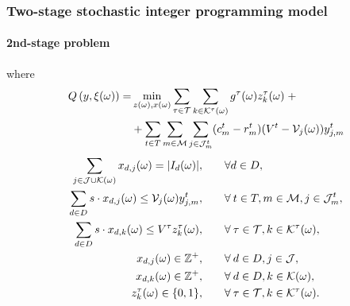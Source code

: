 \documentclass[9pt,xcolor={dvipsnames}]{beamer}
\begin{document}
\begin{frame}[allowframebreaks]
	\frametitle{Two-stage stochastic integer programming model}
	\framesubtitle{2nd-stage problem}
	where
	{
	\footnotesize
	\begin{equation}
		\begin{split}
			Q \left(y,\xi (\omega)\right) = & \min_{z(\omega), x(\omega)} 
			\sum\limits_{\tau \in \cal T}\sum\limits_{k \in \cal K^{\tau}(\omega)} g^{\tau}(\omega) z_k^{\tau}(\omega) \; + \\
			& + \sum\limits_{t \in T} \sum\limits_{m \in {\cal M}} \sum\limits_{j \in {\cal J}^t_{m}} (c_{m}^t-r_{m}^t)(V^{t} - {\cal V}_{j}(\omega)) y_{j,m}^t \label{eq8}
		\end{split}
	\end{equation}
	\begin{alignat}{2}
		\sum\limits_{j \in \cal J \cup {\cal K} (\omega)} x_{d,j}(\omega) = |I_d(\omega)|, & \qquad \forall d \in D, \label{eq9}\\
		\sum\limits_{d \in D} s \cdot x_{d,j}(\omega) \leq {\cal V}_{j}(\omega) y_{j,m}^t, & \qquad \forall \: t \in T, m\in{{\cal M}}, j \in {\cal J}^t_{m}, \label{eq10}\\
		\sum\limits_{d \in D} s \cdot x_{d,k}(\omega) \leq V^\tau z^{\tau}_k(\omega), & \qquad \forall \: \tau \in {\cal T}, k \in {\cal K}^{\tau}(\omega), \label{eq11}\\
		x_{d,j}(\omega) \in \mathbb{Z}^+, & \qquad \forall \: d \in D, j \in {\cal J}, \label{eq12}\\
		x_{d,k}(\omega) \in \mathbb{Z}^+, & \qquad \forall \: d \in D, k \in \cal K(\omega), \label{eq13}\\
		z_k^{\tau}(\omega) \in \{0, 1\}, & \qquad \forall \: \tau \in {\cal T}, k \in {\cal K}^{\tau}(\omega). \label{eq14}
	\end{alignat}
	}
\end{frame}
\end{document}
